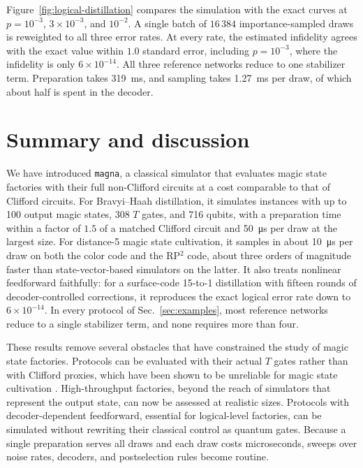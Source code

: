 \documentclass[aps,prx,twocolumn,superscriptaddress,longbibliography]{revtex4-2}
\newcommand{\simname}{\texttt{magna}}
\begin{document}
Figure~\ref{fig:logical-distillation} compares the simulation with the exact curves
at $p=10^{-3}$, $3\times10^{-3}$, and $10^{-2}$.
A single batch of $16\,384$ importance-sampled draws is reweighted to all three error rates.
At every rate, the estimated infidelity agrees with the exact value within $1.0$ standard error,
including $p=10^{-3}$, where the infidelity is only $6\times10^{-14}$.
All three reference networks reduce to one stabilizer term.
Preparation takes \qty{319}{\milli\second}, and sampling takes \qty{1.27}{\milli\second} per draw,
of which about half is spent in the decoder.

\section{Summary and discussion}\label{sec:discussion}

We have introduced \simname, a classical simulator that evaluates magic state factories
with their full non-Clifford circuits at a cost comparable to that of Clifford circuits.
For Bravyi--Haah distillation, it simulates instances with up to 100 output magic states,
308 $T$ gates, and 716 qubits,
with a preparation time within a factor of $1.5$ of a matched Clifford circuit
and \qty{50}{\micro\second} per draw at the largest size.
For distance-5 magic state cultivation, it samples in about \qty{10}{\micro\second} per draw
on both the color code and the RP$^2$ code,
about three orders of magnitude faster than state-vector-based simulators on the latter.
It also treats nonlinear feedforward faithfully:
for a surface-code 15-to-1 distillation with fifteen rounds of decoder-controlled corrections,
it reproduces the exact logical error rate down to $6\times10^{-14}$.
In every protocol of Sec.~\ref{sec:examples}, most reference networks reduce to a single stabilizer term, and none requires more than four.

These results remove several obstacles that have constrained the study of magic state factories.
Protocols can be evaluated with their actual $T$ gates rather than with Clifford proxies,
which have been shown to be unreliable for magic state cultivation \cite{liSOFTHighperformanceSimulator2025, wanExactLogicalError2026}.
High-throughput factories, beyond the reach of simulators that represent the output state,
can now be assessed at realistic sizes.
Protocols with decoder-dependent feedforward, essential for logical-level factories,
can be simulated without rewriting their classical control as quantum gates.
Because a single preparation serves all draws and each draw costs microseconds,
sweeps over noise rates, decoders, and postselection rules become routine.
\end{document}
